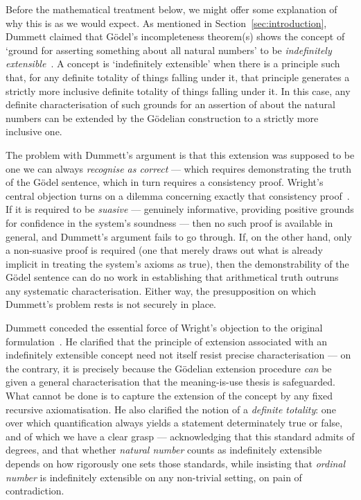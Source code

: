 \documentclass[reqno]{asl}
\begin{document}
Before the mathematical treatment below, we might offer some explanation of why this is as we would expect.  As mentioned in Section~\ref{sec:introduction}, Dummett claimed that G\"{o}del's incompleteness theorem(s) shows the concept of `ground for asserting
something about all natural numbers' to be \emph{indefinitely extensible}~\cite{dummett1963}. A concept is `indefinitely
extensible' when there is a principle such that, for any definite totality
of things falling under it, that principle generates a strictly more inclusive
definite totality of things falling under it. In this case, any definite characterisation of such grounds for an assertion of about the natural numbers can be
extended by the G\"{o}delian construction to a strictly more inclusive one.

The problem with Dummett's argument is that this extension was supposed to be
one we can always \emph{recognise as correct} --- which requires demonstrating
the truth of the G\"{o}del sentence, which in turn requires a consistency
proof. Wright's central objection turns on a dilemma concerning exactly that
consistency proof~\cite{wright1994}. If it is required to be \emph{suasive} --- genuinely
informative, providing positive grounds for confidence in the system's
soundness --- then no such proof is available in general, and Dummett's
argument fails to go through. If, on the other hand, only a non-suasive proof
is required (one that merely draws out what is already implicit in treating
the system's axioms as true), then the demonstrability of the G\"{o}del
sentence can do no work in establishing that arithmetical truth outruns any
systematic characterisation. Either way, the presupposition on which
Dummett's problem rests is not securely in place.

Dummett conceded the essential force of Wright's objection to the original
formulation~\cite{Dummett1994}. He clarified that the principle of extension associated with an
indefinitely extensible concept need not itself resist precise
characterisation --- on the contrary, it is precisely because the
G\"{o}delian extension procedure \emph{can} be given a general
characterisation that the meaning-is-use thesis is safeguarded. What cannot
be done is to capture the extension of the concept by any fixed recursive
axiomatisation. He also clarified the notion of a \emph{definite totality}: one over
which quantification always yields a statement determinately true or false,
and of which we have a clear grasp --- acknowledging that this standard admits
of degrees, and that whether \emph{natural number} counts as indefinitely
extensible depends on how rigorously one sets those standards, while insisting
that \emph{ordinal number} is indefinitely extensible on any non-trivial
setting, on pain of contradiction.
\end{document}
